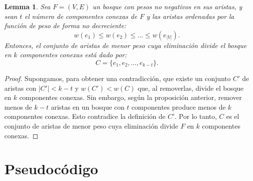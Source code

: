 \documentclass[12pt]{article}
\newtheorem{lemma}{Lemma}
\begin{document}
\begin{lemma}
Sea \( F = (V, E) \) un bosque con pesos no negativos en sus aristas, y sean \( t \) el número de componentes conexas de \( F \) y las aristas ordenadas por la función de peso de forma no decreciente:
\[
w(e_1) \le w(e_2) \le \dots \le w(e_{|V|}).
\]
Entonces, el conjunto de aristas de menor peso cuya eliminación divide el bosque en \( k \) componentes conexas está dado por:
\[
C = \{ e_1, e_2, \dots, e_{k-t} \}.
\]
\end{lemma}

\begin{proof}
Supongamos, para obtener una contradicción, que existe un conjunto \( C' \) de aristas con \( |C'| < k-t \) y \( w(C') < w(C) \) que, al removerlas, divide el bosque en \( k \) componentes conexas.  
Sin embargo, según la proposición anterior, remover menos de \( k-t \) aristas en un bosque con \( t \) componentes produce menos de \( k \) componentes conexas.  
Esto contradice la definición de $C'$.  
Por lo tanto, \( C \) es el conjunto de aristas de menor peso cuya eliminación divide \( F \) en \( k \) componentes conexas.
\end{proof}


\section{Pseudocódigo}
\end{document}
